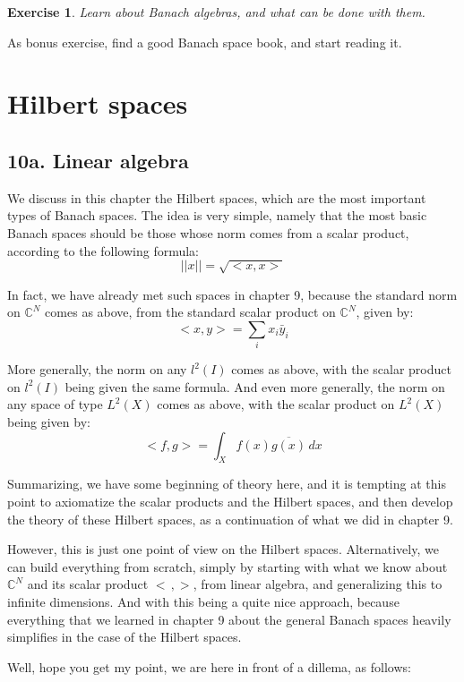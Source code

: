 \documentclass[12pt]{amsbook}
\newtheorem{exercise}[theorem]{Exercise}
\begin{document}
\begin{exercise}
Learn about Banach algebras, and what can be done with them.
\end{exercise}

As bonus exercise, find a good Banach space book, and start reading it.

\chapter{Hilbert spaces}

\section*{10a. Linear algebra}

We discuss in this chapter the Hilbert spaces, which are the most important types of Banach spaces. The idea is very simple, namely that the most basic Banach spaces should be those whose norm comes from a scalar product, according to the following formula:
$$||x||=\sqrt{<x,x>}$$

In fact, we have already met such spaces in chapter 9, because the standard norm on $\mathbb C^N$ comes as above, from the standard scalar product on $\mathbb C^N$, given by:
$$<x,y>=\sum_ix_i\bar{y}_i$$

More generally, the norm on any $l^2(I)$ comes as above, with the scalar product on $l^2(I)$ being given the same formula. And even more generally, the norm on any space of type $L^2(X)$ comes as above, with the scalar product on $L^2(X)$ being given by:
$$<f,g>=\int_Xf(x)\overline{g(x)}\,dx$$

Summarizing, we have some beginning of theory here, and it is tempting at this point to axiomatize the scalar products and the Hilbert spaces, and then develop the theory of these Hilbert spaces, as a continuation of what we did in chapter 9.

\bigskip

However, this is just one point of view on the Hilbert spaces. Alternatively, we can build everything from scratch, simply by starting with what we know about $\mathbb C^N$ and its scalar product $<\,,>$, from linear algebra, and generalizing this to infinite dimensions. And with this being a quite nice approach, because everything that we learned in chapter 9 about the general Banach spaces heavily simplifies in the case of the Hilbert spaces.

\bigskip

Well, hope you get my point, we are here in front of a dillema, as follows:
\end{document}
